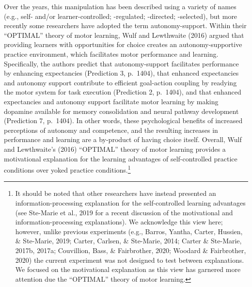\documentclass[
  english,
  man, donotrepeattitle,floatsintext]{apa7}
\begin{document}
Over the years, this manipulation has been described using a variety of names (e.g., self- and/or learner-controlled; -regulated; -directed; -selected), but more recently some researchers have adopted the term autonomy-support. Within their ``OPTIMAL'' theory of motor learning, Wulf and Lewthwaite (2016) argued that providing learners with opportunities for choice creates an autonomy-supportive practice environment, which facilitates motor performance and learning. Specifically, the authors predict that autonomy-support facilitates performance by enhancing expectancies (Prediction 3, p.~1404), that enhanced expectancies and autonomy support contribute to efficient goal-action coupling by readying the motor system for task execution (Prediction 2, p.~1404), and that enhanced expectancies and autonomy support facilitate motor learning by making dopamine available for memory consolidation and neural pathway development (Prediction 7, p.~1404). In other words, these psychological benefits of increased perceptions of autonomy and competence, and the resulting increases in performance and learning are a by-product of having choice itself. Overall, Wulf and Lewthwaite's (2016) ``OPTIMAL'' theory of motor learning provides a motivational explanation for the learning advantages of self-controlled practice conditions over yoked practice conditions.\footnote{It should be noted that other researchers have instead presented an information-processing explanation for the self-controlled learning advantages (see Ste-Marie et al., 2019 for a recent discussion of the motivational and information-processing explanations). We acknowledge this view here; however, unlike previous experiments (e.g., Barros, Yantha, Carter, Hussien, \& Ste-Marie, 2019; Carter, Carlsen, \& Ste-Marie, 2014; Carter \& Ste-Marie, 2017b, 2017a; Couvillion, Bass, \& Fairbrother, 2020; Woodard \& Fairbrother, 2020) the current experiment was not designed to test between explanations. We focused on the motivational explanation as this view has garnered more attention due the ``OPTIMAL'' theory of motor learning.}
\end{document}
